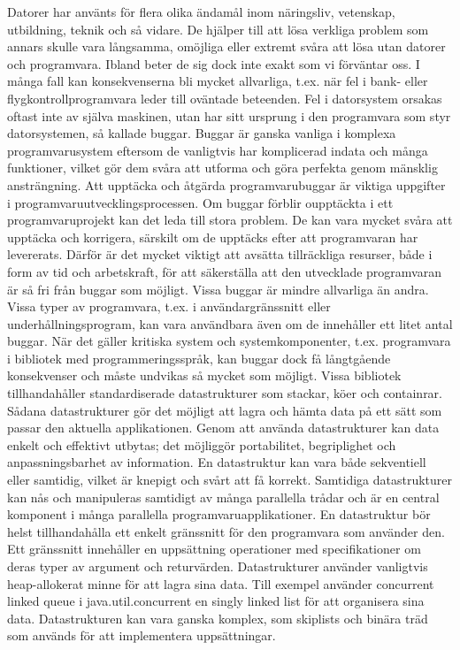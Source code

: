 Datorer har använts för flera olika ändamål inom näringsliv, vetenskap, utbildning, teknik och så vidare. De hjälper till att lösa verkliga problem som annars skulle vara långsamma, omöjliga eller extremt svåra att lösa utan datorer och programvara. Ibland beter de sig dock inte exakt som vi förväntar oss. I många fall kan konsekvenserna bli mycket allvarliga, t.ex. när fel i bank- eller flygkontrollprogramvara leder till oväntade beteenden. Fel i datorsystem orsakas oftast inte av själva maskinen, utan har sitt ursprung i den programvara som styr datorsystemen, så kallade buggar. Buggar är ganska vanliga i komplexa programvarusystem eftersom de vanligtvis har komplicerad indata och många funktioner, vilket gör dem svåra att utforma och göra perfekta genom mänsklig ansträngning. Att upptäcka och åtgärda programvarubuggar är viktiga uppgifter i programvaruutvecklingsprocessen. Om buggar förblir oupptäckta i ett programvaruprojekt kan det leda till stora problem. De kan vara mycket svåra att upptäcka och korrigera, särskilt om de upptäcks efter att programvaran har levererats. Därför är det mycket viktigt att avsätta tillräckliga resurser, både i form av tid och arbetskraft, för att säkerställa att den utvecklade programvaran är så fri från buggar som möjligt.
Vissa buggar är mindre allvarliga än andra. Vissa typer av programvara, t.ex. i användargränssnitt eller underhållningsprogram, kan vara användbara även om de innehåller ett litet antal buggar. När det gäller kritiska system och systemkomponenter, t.ex. programvara i bibliotek med programmeringsspråk, kan buggar dock få långtgående konsekvenser och måste undvikas så mycket som möjligt. Vissa bibliotek tillhandahåller standardiserade datastrukturer som stackar, köer och containrar. Sådana datastrukturer gör det möjligt att lagra och hämta data på ett sätt som passar den aktuella applikationen. Genom att använda datastrukturer kan data enkelt och effektivt utbytas; det möjliggör portabilitet, begriplighet och anpassningsbarhet av information. 
En datastruktur kan vara både sekventiell eller samtidig, vilket är knepigt och svårt att få korrekt. Samtidiga datastrukturer kan nås och manipuleras samtidigt av många parallella trådar och är en central komponent i många parallella programvaruapplikationer. En datastruktur bör helst tillhandahålla ett enkelt gränssnitt för den programvara som använder den. Ett gränssnitt innehåller en uppsättning operationer med specifikationer om deras typer av argument och returvärden. Datastrukturer använder vanligtvis heap-allokerat minne för att lagra sina data. Till exempel använder concurrent linked queue i java.util.concurrent en singly linked list för att organisera sina data. Datastrukturen kan vara ganska komplex, som skiplists och binära träd som används för att implementera uppsättningar.
